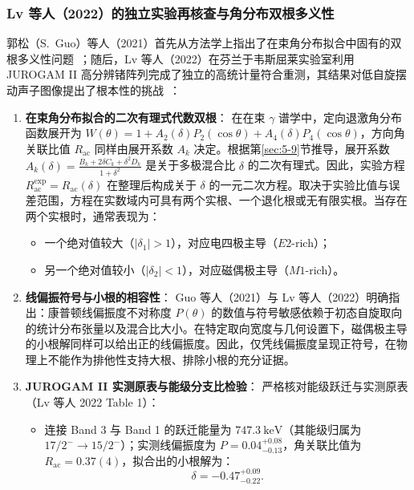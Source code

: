\subsubsection{Lv 等人（2022）的独立实验再核查与角分布双根多义性}

郭松（S.~Guo）等人（2021）首先从方法学上指出了在束角分布拟合中固有的双根多义性问题~\cite{guo-2021-comment-transverse-wobbling-135pr}；随后，Lv 等人（2022）在芬兰于韦斯屈莱实验室利用 JUROGAM II 高分辨锗阵列完成了独立的高统计量符合重测，其结果对低自旋摆动声子图像提出了根本性的挑战~\cite{lv-2022-evidence-against-wobbling-135pr}：
\begin{enumerate}
\item \textbf{在束角分布拟合的二次有理式代数双根}：
在在束 $\gamma$ 谱学中，定向退激角分布函数展开为 $W(\theta) = 1 + A_2(\delta) P_2(\cos\theta) + A_4(\delta) P_4(\cos\theta)$，方向角关联比值 $R_{\mathrm{ac}}$ 同样由展开系数 $A_k$ 决定。根据第\ref{sec:5-9}节推导，展开系数 $A_k(\delta) = \frac{B_k + 2\delta C_k + \delta^2 D_k}{1 + \delta^2}$ 是关于多极混合比 $\delta$ 的二次有理式。因此，实验方程 $R_{\mathrm{ac}}^{\text{exp}} = R_{\mathrm{ac}}(\delta)$ 在整理后构成关于 $\delta$ 的一元二次方程。取决于实验比值与误差范围，方程在实数域内可具有两个实根、一个退化根或无有限实根。当存在两个实根时，通常表现为：
\begin{itemize}
\item 一个绝对值较大（$|\delta_1| > 1$），对应电四极主导（$E2$-rich）；
\item 另一个绝对值较小（$|\delta_2| < 1$），对应磁偶极主导（$M1$-rich）。
\end{itemize}
\item \textbf{线偏振符号与小根的相容性}：
Guo 等人（2021）与 Lv 等人（2022）明确指出：康普顿线偏振度不对称度 $P(\theta)$ 的数值与符号敏感依赖于初态自旋取向的统计分布张量以及混合比大小。在特定取向宽度与几何设置下，磁偶极主导的小根解同样可以给出正的线偏振度。因此，仅凭线偏振度呈现正符号，在物理上不能作为排他性支持大根、排除小根的充分证据。
\item \textbf{JUROGAM II 实测原表与能级分支比检验}：
严格核对能级跃迁与实测原表（Lv 等人 2022 Table 1）：
\begin{itemize}
\item 连接 Band 3 与 Band 1 的跃迁能量为 $747.3\ \mathrm{keV}$（其能级归属为 $17/2^- \to 15/2^-$）；实测线偏振度为 $P = 0.04_{-0.13}^{+0.08}$，角关联比值为 $R_{\mathrm{ac}} = 0.37(4)$，拟合出的小根解为：
\begin{equation}\label{eq:4-4-pr135-small-delta-747}
\delta = -0.47_{-0.22}^{+0.09}.
\end{equation}

\end{itemize}
\end{enumerate}
